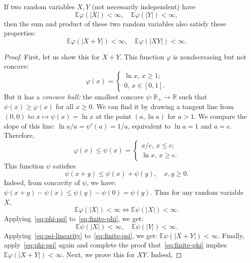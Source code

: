 \documentclass[12pt]{amsart}
\begin{document}
\begin{lemma} If two random variables $X, Y$ (not necessarily independent) have 
\begin{equation}
\label{eq:finite-phi}
\mathbb E\varphi(|X|) < \infty,\quad \mathbb E\varphi(|Y|) < \infty,
\end{equation}
then the sum and product of these two random variables also satisfy these properties:
$$
\mathbb E\varphi(|X + Y|) < \infty,\quad \mathbb E\varphi(|XY|) < \infty.
$$
\label{lemma:sum-product}
\end{lemma}

\begin{proof} First, let us show this for $X + Y$. This function $\varphi$ is nondecreasing but not concave:
$$
\varphi(x) = 
\begin{cases} 
\ln x, \, x \ge 1;\\ 
0,\, x \in [0, 1]. 
\end{cases}
$$
But it has a {\it concave hull:} the smallest concave $\psi : \mathbb R_+ \to \mathbb R$ such that $\psi(x) \ge \varphi(x)$ for all $x \ge 0$. We can find it by drawing a tangent line from $(0, 0)$ to $x \mapsto \psi(x) = \ln x$ at the point $(a, \ln a)$ for $a > 1$. We compare the slope of this line: $\ln a/a = \psi'(a) = 1/a$, equivalent to  $\ln a = 1$ and $a = e$. Therefore,
$$
\varphi(x) \le \psi(x) = 
\begin{cases}
x/e,\, x \le e;\\
\ln x,\, x \ge e.
\end{cases}
$$
This function $\psi$ satisfies 
\begin{equation}
\label{eq:psi-linearity}
\psi(x + y) \le \psi(x) + \psi(y),\quad x, y \ge 0.
\end{equation}
Indeed, from concavity of $\psi$, we have: $\psi(x + y) - \psi(x) \le \psi(y) - \psi(0) = \psi(y)$. Thus for any random variable $X$, 
\begin{equation}
\label{eq:phi-psi}
\mathbb E\varphi(|X|) < \infty \Leftrightarrow \mathbb E\psi(|X|) < \infty.
\end{equation}
Applying~\eqref{eq:phi-psi} to~\eqref{eq:finite-phi}, we get: 
\begin{equation}
\label{eq:finite-psi}
\mathbb E\psi(|X|) < \infty,\quad \mathbb E\psi(|Y|) < \infty.
\end{equation}
Applying~\eqref{eq:psi-linearity} to~\eqref{eq:finite-psi}, we get: $\mathbb E\psi(|X + Y|) < \infty$. Finally, apply~\eqref{eq:phi-psi} again and complete the proof that~\eqref{eq:finite-phi} implies $\mathbb E\varphi(|X + Y|) < \infty$. Next, we prove this for $XY$. Indeed, 

\end{proof}
\end{document}
